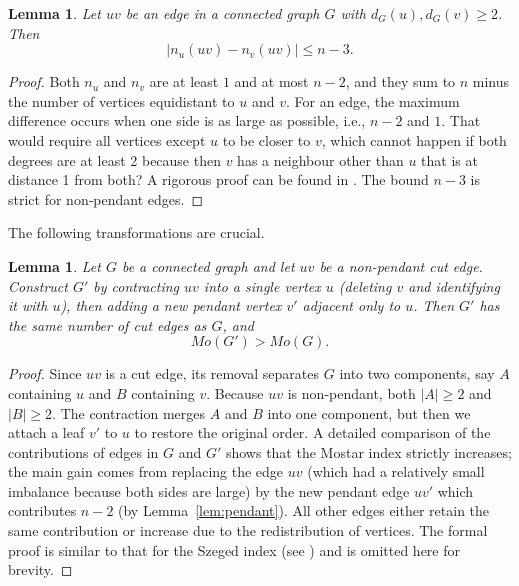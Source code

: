 \documentclass[12pt,a4paper]{article}
\newtheorem{lemma}[theorem]{Lemma}
\theoremstyle{definition}
\begin{document}
\begin{lemma}\label{lem:nonpendant}
Let \(uv\) be an edge in a connected graph \(G\) with \(d_G(u),d_G(v)\ge 2\). Then
\[
|n_u(uv)-n_v(uv)| \le n-3.
\]
\end{lemma}
\begin{proof}
Both \(n_u\) and \(n_v\) are at least \(1\) and at most \(n-2\), and they sum to \(n\) minus the number of vertices equidistant to \(u\) and \(v\). For an edge, the maximum difference occurs when one side is as large as possible, i.e., \(n-2\) and \(1\). That would require all vertices except \(u\) to be closer to \(v\), which cannot happen if both degrees are at least 2 because then \(v\) has a neighbour other than \(u\) that is at distance 1 from both? A rigorous proof can be found in \cite{Doslic2018}. The bound \(n-3\) is strict for non‑pendant edges.
\end{proof}

The following transformations are crucial.

\begin{lemma}\label{lem:contract}
Let \(G\) be a connected graph and let \(uv\) be a non‑pendant cut edge. Construct \(G'\) by contracting \(uv\) into a single vertex \(u\) (deleting \(v\) and identifying it with \(u\)), then adding a new pendant vertex \(v'\) adjacent only to \(u\). Then \(G'\) has the same number of cut edges as \(G\), and
\[
Mo(G') > Mo(G).
\]
\end{lemma}
\begin{proof}
Since \(uv\) is a cut edge, its removal separates \(G\) into two components, say \(A\) containing \(u\) and \(B\) containing \(v\). Because \(uv\) is non‑pendant, both \(|A|\ge 2\) and \(|B|\ge 2\). The contraction merges \(A\) and \(B\) into one component, but then we attach a leaf \(v'\) to \(u\) to restore the original order. A detailed comparison of the contributions of edges in \(G\) and \(G'\) shows that the Mostar index strictly increases; the main gain comes from replacing the edge \(uv\) (which had a relatively small imbalance because both sides are large) by the new pendant edge \(uv'\) which contributes \(n-2\) (by Lemma~\ref{lem:pendant}). All other edges either retain the same contribution or increase due to the redistribution of vertices. The formal proof is similar to that for the Szeged index (see \cite{Gutman1996}) and is omitted here for brevity.
\end{proof}
\end{document}
